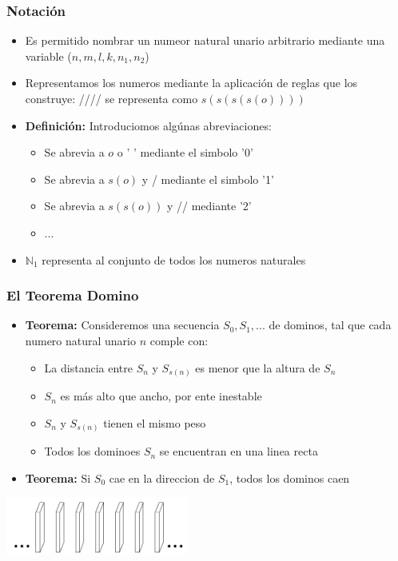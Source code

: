 \documentclass{beamer}
\begin{document}
\begin{frame}
    \frametitle{Notaci\'on}
    \begin{itemize}
        \item{Es permitido nombrar un numeor natural unario arbitrario mediante una variable ($n,m,l,k,n_1,n_2$)}
        \item{Representamos los numeros mediante la aplicaci\'on de reglas que los construye: ////
        se representa como $s(s(s(s(o))))$}
        \item{{\bf Definici\'on: }Introduciomos alg\'unas abreviaciones:
        \begin{itemize}
            \item{Se abrevia a $o$ o ' ' mediante el simbolo '0'}
            \item{Se abrevia a $s(o)$ y / mediante el simbolo '1'}
            \item{Se abrevia a $s(s(o))$ y // mediante '2'}
            \item{...}
        \end{itemize}
        }
        \item{$\mathbb{N}_1$ representa al conjunto de todos los numeros naturales}
    \end{itemize}
\end{frame}

\begin{frame}
    \frametitle{El Teorema Domino}
    \begin{itemize}
        \item{{\bf Teorema: }Consideremos una secuencia $S_0,S_1,...$ de dominos, tal
        que cada numero natural unario $n$ comple con:
        \begin{itemize}
            \item{La distancia entre $S_n$ y $S_{s(n)}$ es menor que la altura de $S_n$}
            \item{$S_n$ es m\'as alto que ancho, por ente inestable}
            \item{$S_n$ y $S_{s(n)}$ tienen el mismo peso}
            \item{Todos los dominoes $S_n$ se encuentran en una linea recta}
        \end{itemize}
        }
        \item{{\bf Teorema: }Si $S_0$ cae en la direccion de $S_1$, todos los dominos caen}
    \end{itemize}
    \begin{center}
        \includegraphics[width=6cm]{dominoes.png}
    \end{center}
\end{frame}
\end{document}
